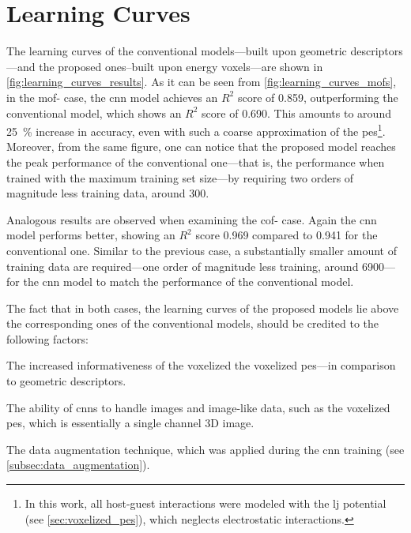 \section{Learning Curves}

The learning curves of the conventional models---built
upon geometric descriptors---and the proposed ones--built upon energy
voxels---are shown in \Figure{} \ref{fig:learning_curves_results}. As it can be
seen from \Figure{} \ref{fig:learning_curves_mofs}, in the \gls{mof}- case,
the \gls{cnn} model achieves an $R^2$ score of \num{0.859}, outperforming the
conventional model, which shows an $R^2$ score of \num{0.690}. This amounts to
around \SI{25}{\percent} increase in accuracy, even with such a coarse
approximation of the \gls{pes}\footnote{In this work, all host-guest
interactions were modeled with the \gls{lj} potential (see \Section{}
\ref{sec:voxelized_pes}), which neglects electrostatic interactions.}. Moreover,
from the same figure, one can notice that the proposed model reaches the peak
performance of the conventional one---that is, the performance when trained with
the maximum training set size---by requiring two orders of magnitude less
training data, around \num{300}.

Analogous results are observed when examining the \gls{cof}- case. Again
the \gls{cnn} model performs better, showing an $R^2$ score \num{0.969} compared
to \num{0.941} for the conventional one. Similar to the previous case, a
substantially smaller amount of training data are required---one order of
magnitude less training, around \num{6900}---for the \gls{cnn} model to match
the performance of the conventional model.

The fact that in both cases, the learning curves of the proposed models lie
above the corresponding ones of the conventional models, should be credited to
the following factors:
\begin{enumerate*}[label=\roman*).]
	\item The increased informativeness of the voxelized the voxelized
		\gls{pes}---in comparison to geometric descriptors.
	\item The ability of \glspl{cnn} to handle images and image-like
		data, such as the voxelized \gls{pes}, which is
		essentially a single channel 3D image.
	\item The data augmentation technique, which was
		applied during the \gls{cnn} training (see \Section{}
		\ref{subsec:data_augmentation}).
\end{enumerate*}

